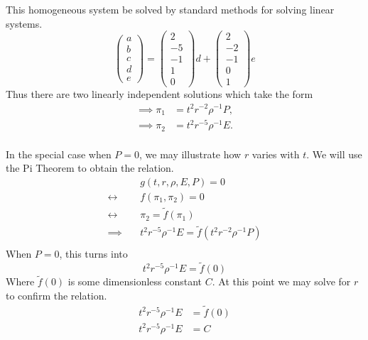 \documentclass[12pt]{article}
\begin{document}
  This homogeneous system be solved by standard methods for solving linear
  systems.
  \begin{equation*}
    \begin{pmatrix}
      a \\ b \\ c \\ d \\ e
    \end{pmatrix}
    =
    \begin{pmatrix}
      2 \\ -5 \\ -1 \\ 1 \\ 0
    \end{pmatrix} d
    +
    \begin{pmatrix}
      2 \\ -2 \\ -1 \\ 0 \\ 1
    \end{pmatrix}
    e
  \end{equation*}
  Thus there are two linearly independent solutions which take the form
  \begin{equation}
    \label{eq:4-p-ne-sol}
    \boxed{
      \begin{aligned}
        \implies \pi_1 &= t^2r^{-2}\rho^{-1}P, \\
        \implies \pi_2 &= t^2r^{-5}\rho^{-1}E. \\
      \end{aligned}
    }
  \end{equation}

  In the special case when $P=0$, we may illustrate how $r$ varies with $t$. We
  will use the Pi Theorem to obtain the relation.
  \begin{equation*}
    \begin{aligned}
      & g(t,r,\rho,E,P) = 0 \\
      \leftrightarrow\quad& f(\pi_1, \pi_2) = 0 \\
      \leftrightarrow\quad& \pi_2 = \tilde{f}(\pi_1) \\
      \implies\quad& t^2r^{-5}\rho^{-1}E = \tilde{f}(t^2r^{-2}\rho^{-1}P) \\
    \end{aligned}
  \end{equation*}
  When $P=0$, this turns into
  \begin{equation*}
    t^2r^{-5}\rho^{-1}E = \tilde{f}(0)
  \end{equation*}
  Where $\tilde{f}(0)$ is some dimensionless constant $C$. At this point we may
  solve for $r$ to confirm the relation.
  \begin{equation*}
    \begin{aligned}
      t^2r^{-5}\rho^{-1}E &= \tilde{f}(0) \\
      t^2r^{-5}\rho^{-1}E &= C \\
    \end{aligned}
  \end{equation*}
\end{document}

